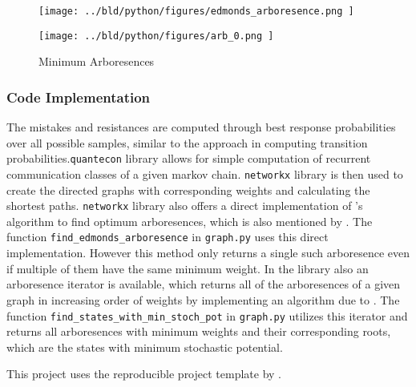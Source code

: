 \documentclass[11pt, a4paper, leqno]{article}
\begin{document}
\begin{figure}
    \centering
    \begin{minipage}{.5\textwidth}
      \centering
      \texttt{[image: ../bld/python/figures/edmonds\_arboresence.png
      ]}
      \label{fig:ar0}
    \end{minipage}%
    \begin{minipage}{.5\textwidth}
      \centering
      \texttt{[image: ../bld/python/figures/arb\_0.png
      ]}
      \label{fig:arb1}
    \end{minipage}
    \caption{Minimum Arboresences}
\end{figure}


\subsubsection*{Code Implementation}
The mistakes and resistances are computed through best response probabilities over all possible samples, similar to the approach
in computing transition probabilities.\texttt{quantecon} library allows for simple computation of recurrent communication
classes of a given markov chain. \texttt{networkx} library is then used to create the directed graphs with corresponding
weights and calculating the shortest paths. \texttt{networkx} library also offers a direct implementation of 's
algorithm to find optimum arboresences, which is also mentioned by . The function \texttt{find\_edmonds\_arboresence}
in \texttt{graph.py} uses this direct implementation. However this method only returns a single such arboresence even if
multiple of them have the same minimum weight. In the library also an arboresence iterator is available,
which returns all of the arboresences of a given graph in increasing order of weights by implementing an
algorithm due to . The function \texttt{find\_states\_with\_min\_stoch\_pot} in \texttt{graph.py} utilizes this iterator and
returns all arboresences with minimum weights and their corresponding roots, which are the states with minimum
stochastic potential.




This project uses the reproducible project template by .



\printbibliography
{}
\end{document}
